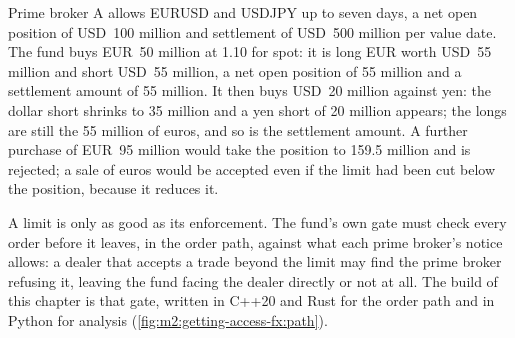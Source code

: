 \begin{example}\label{ex:m2:getting-access-fx:nop}
Prime broker A allows EURUSD and USDJPY up to seven days, a net open position of USD~100
million and settlement of USD~500 million per value date. The fund buys EUR~50 million
at 1.10 for spot: it is long EUR worth USD~55 million and short USD~55 million, a net
open position of 55 million and a settlement amount of 55 million. It then buys USD~20
million against yen: the dollar short shrinks to 35 million and a yen short of 20
million appears; the longs are still the 55 million of euros, and so is the settlement
amount. A further purchase of EUR~95 million would take the position to 159.5 million
and is rejected; a sale of euros would be accepted even if the limit had been cut below
the position, because it reduces it.
\end{example}

A limit is only as good as its enforcement. The fund's own gate must check every order
before it leaves, in the order path, against what each prime broker's notice allows:
a dealer that accepts a trade beyond the limit may find the prime broker refusing it,
leaving the fund facing the dealer directly or not at all. The build of this chapter
is that gate, written in C++20 and Rust for the order path and in Python for analysis
(\cref{fig:m2:getting-access-fx:path}).

\begin{omfigure}

\label{fig:m2:getting-access-fx:path}
\end{omfigure}

